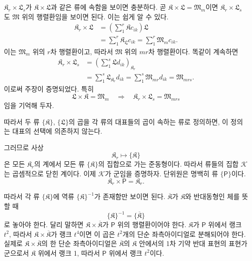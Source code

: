 \(\mathfrak K_r\times\mathfrak L_s\)가 \(\mathfrak K\times\mathfrak L\)과 같은 류에 속함을 보이면 충분하다. 곧 \(\mathfrak K\times\mathfrak L=\mathfrak M_m\)이면 \(\mathfrak K_r\times\mathfrak L_s\)도 \(\mathfrak M\) 위의 행렬환임을 보이면 된다. 이는 쉽게 알 수 있다.
\[
\begin{aligned}
\mathfrak K_r\times\mathfrak L
&=\left(\sum_1^r\mathfrak Kc_{ik}\right)\mathfrak L\\
&=\sum_1^r\mathfrak K_{\mathfrak L}c_{ik}
 =\sum_1^r\mathfrak M_m c_{ik}.
\end{aligned}
\]
이는 \(\mathfrak M_m\) 위의 \(r\)차 행렬환이고, 따라서 \(\mathfrak M\) 위의 \(mr\)차 행렬환이다. 똑같이 계속하면
\[
\begin{aligned}
\mathfrak K_r\times\mathfrak L_s
&=\left(\sum_1^s\mathfrak Ld_{ik}\right)_{\mathfrak K_r}\\
&=\sum_1^s\mathfrak L_{\mathfrak K_r}d_{ik}
 =\sum_1^s\mathfrak M_{mr}d_{ik}
 =\mathfrak M_{mrs}.
\end{aligned}
\]
이로써 주장이 증명되었다. 특히
\[
        \mathfrak L\times\mathfrak K=\mathfrak M_m
        \quad\Longrightarrow\quad
        \mathfrak K_r\times\mathfrak L_s
        =\mathfrak M_{mrs}
\]
임을 기억해 두자.

따라서 두 류 \(\{\mathfrak K\}\), \(\{\mathfrak L\}\)의 곱을 각 류의 대표들의 곱이 속하는 류로 정의하면, 이 정의는 대표의 선택에 의존하지 않는다.

그러므로 사상
\[
        \mathfrak K_r\longmapsto\{\mathfrak K\}
\]
은 모든 \(\mathfrak K_r\)의 계에서 모든 류 \(\{\mathfrak K\}\)의 집합으로 가는 준동형이다. 따라서 류들의 집합 \(\mathscr K\)는 곱셈적으로 닫힌 계이다. 이제 \(\mathscr K\)가 군임을 증명하자. 단위원은 명백히 류 \(\{\mathsf P\}\)이다.
\[
        \mathfrak K_r\times\mathsf P=\mathfrak K_r.
\]

따라서 각 류 \(\{\mathfrak K\}\)에 역류 \(\{\mathfrak K\}^{-1}\)가 존재함만 보이면 된다. \(\overline{\mathfrak K}\)가 \(\mathfrak K\)와 반대동형인 체를 뜻할 때
\[
        \{\mathfrak K\}^{-1}
        =\{\overline{\mathfrak K}\}
\]
로 놓아야 한다. 달리 말하면 \(\mathfrak K\times\overline{\mathfrak K}\)가 \(\mathsf P\) 위의 행렬환이어야 한다. \(\mathfrak K\)가 \(\mathsf P\) 위에서 랭크 \(t^2\), 따라서 \(\mathfrak K\times\overline{\mathfrak K}\)가 랭크 \(t^4\)이면 이 곱은 \(t^2\)개의 단순 좌측아이디얼로 분해되어야 한다. 실제로 \(\mathfrak K\times\overline{\mathfrak K}\)의 한 단순 좌측아이디얼은 \(\overline{\mathfrak K}\)의 \(\mathfrak K\) 안에서의 1차 기약 반대 표현의 표현가군으로서 \(\mathfrak K\) 위에서 랭크 1, 따라서 \(\mathsf P\) 위에서 랭크 \(t^2\)이다.


